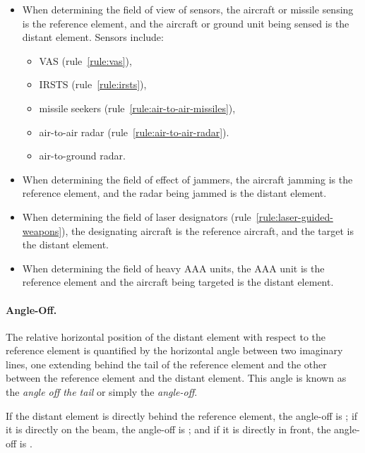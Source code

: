 {\begin{itemize}
\item When determining the field of view of sensors, the aircraft or missile sensing is the reference element, and the aircraft or ground unit being sensed is the distant element. Sensors include:
\begin{itemize} 
\item VAS (rule~\ref{rule:vas}),
\item IRSTS (rule~\ref{rule:irsts}),
\item missile seekers (rule~\ref{rule:air-to-air-missiles}),
\item air-to-air radar (rule~\ref{rule:air-to-air-radar}).
\item air-to-ground radar.
\end{itemize}

\item When determining the field of effect of jammers, the aircraft jamming is the reference element, and the radar being jammed is the distant element.

\item When determining the field of laser designators (rule~\ref{rule:laser-guided-weapons}), the designating aircraft is the reference aircraft, and the target is the distant element.

\item When determining the field of heavy AAA units, the AAA unit is the reference element and the aircraft being targeted is the distant element.

\end{itemize}





\paragraph{Angle-Off.} 

The relative horizontal position of the distant element with respect to the reference element is quantified by the horizontal angle between two imaginary lines, one extending behind the tail of the reference element and the other between the reference element and the distant element. This angle is known as the \emph{angle off the tail} or simply the \emph{angle-off}. 

If the distant element is directly behind the reference element, the angle-off is ; if it is directly on the beam, the angle-off is ; and if it is directly in front, the angle-off is .

}
